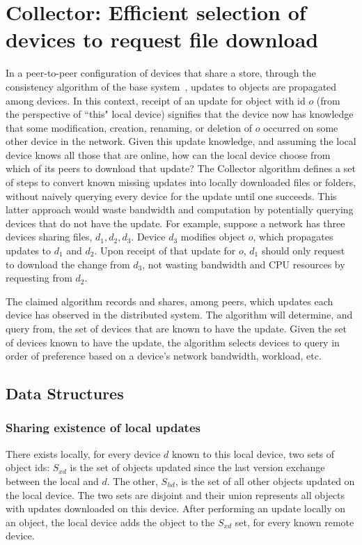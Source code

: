 \section*{Collector: Efficient selection of devices to request file download}

In a peer-to-peer configuration of devices that share a store, through the
consistency algorithm of the base system~\cite{wang:patent2012}, updates to
objects are propagated among devices. In this context, receipt of an update for
object with id $o$ (from the perspective of ``this" local device) signifies that
the device now has knowledge that some modification, creation, renaming, or
deletion of $o$ occurred on some other device in the network. Given this update
knowledge, and assuming the local device knows all those that are online, how
can the local device choose from which of its peers to download that update? The
Collector algorithm defines a set of steps to convert known missing updates into
locally downloaded files or folders, without naively querying every device for
the update until one succeeds. This latter approach would waste bandwidth and
computation by potentially querying devices that do not have the update. For
example, suppose a network has three devices sharing files, $d_1, d_2, d_3$.
Device $d_3$ modifies object $o$, which propagates updates to $d_1$ and $d_2$.
Upon receipt of that update for $o$, $d_1$ should only request to download the
change from $d_3$, not wasting bandwidth and CPU resources by requesting from
$d_2$.

The claimed algorithm records and shares, among peers, which updates each device
has observed in the distributed system. The algorithm will determine, and query
from, the set of devices that are known to have the update. Given the set of
devices known to have the update, the algorithm selects devices to query in
order of preference based on a device's network bandwidth, workload, etc.

\subsection*{Data Structures}

\subsubsection*{Sharing existence of local updates}

There exists locally, for every device $d$ known to this local device, two sets
of object ids: $S_{xd}$ is the set of objects updated since the last version
exchange between the local and $d$. The other, $S_{hd}$, is the set of all other
objects updated on the local device. The two sets are disjoint and their union
represents all objects with updates downloaded on this device. After performing
an update locally on an object, the local device adds the object to the $S_{xd}$
set, for every known remote device.

